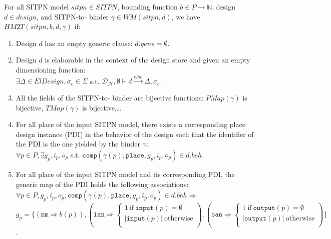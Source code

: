 \def\pdiInBeh{\mathtt{comp}(\gamma(p),\mathtt{place},g_p,i_p,o_p)\in{}d.beh}
\def\tdiInBeh{\mathtt{comp}(\gamma(t),\mathtt{transition},g_t,i_t,o_t)\in{}d.beh}

\begin{definition}
  \label{def:hm2t-spec}
  For all SITPN model $sitpn\in{}SITPN$, bounding function
  $b\in{}P\rightarrow\mathbb{N}$, \hvhdl{} design $d\in{}design$, and
  SITPN-to-\hvhdl{} binder $\gamma\in{}WM(sitpn,d)$, we have
  $HM2T(sitpn,b,d,\gamma)$ if:
  
  \begin{enumerate}
  \item Design $d$ has an empty generic clause: $d.gens=\emptyset$.
    
  \item Design $d$ is elaborable in the context of the \hilecop{} design store and given an empty dimensioning function:\\
    $\exists{}\Delta\in{}ElDesign,\sigma_e\in\Sigma$ s.t.
    $\mathcal{D_\mathcal{H}},\emptyset\vdash{}d\xrightarrow{elab}\Delta,\sigma_e$.
    
  \item All the fields of the SITPN-to-\hvhdl{} binder are bijective
    functions: $PMap(\gamma)$ is bijective, $TMap(\gamma)$ is
    bijective,\dots
    
  \item For all place of the input SITPN model, there exists a
    corresponding place design instance (PDI) in the behavior of the
    \hvhdl{} design such that the identifier of the PDI is the one
    yielded
    by the binder $\gamma$:\\
    $\forall{}p\in{}P,\exists{}g_p,i_p,o_p$ s.t.  $\pdiInBeh$.
    
  \item For all place of the input SITPN model and its corresponding PDI, the generic map of the PDI holds the following associations:\\
    $\forall{}p\in{}P,g_p,i_p,o_p,\pdiInBeh\Rightarrow$\\
    $g_p=\{(\mathtt{mm}\Rightarrow{}b(p)), (\mathtt{ian}\Rightarrow
    \begin{cases}
      1~\mathrm{if}~\mathtt{input}(p)=\emptyset \\
      \vert{}\mathtt{input}(p)\vert~\mathrm{otherwise} \\
    \end{cases}),
    (\mathtt{oan}\Rightarrow
    \begin{cases}
      1~\mathrm{if}~\mathtt{output}(p)=\emptyset \\
      \vert{}\mathtt{output}(p)\vert~\mathrm{otherwise} \\
    \end{cases})\}$.
    

\end{enumerate}
\end{definition}
